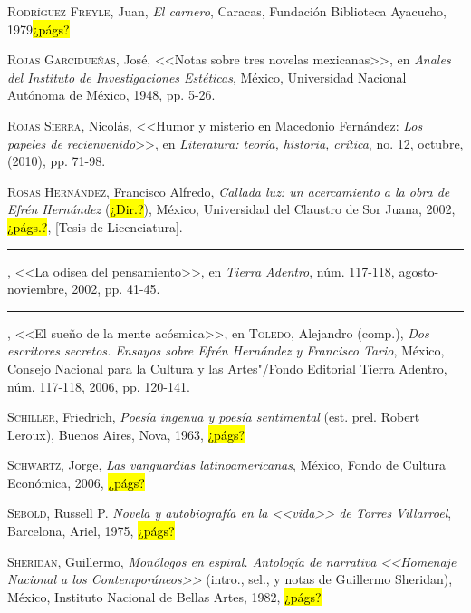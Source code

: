 \documentclass[14pt,twoside,final]{extbook} %
\begin{document}
\textsc{Rodríguez Freyle}, Juan, \emph{El carnero}, Caracas, Fundación Biblioteca Ayacucho, 1979\hl{¿págs?}\label{bib:rodriguez1979}

\textsc{Rojas Garcidueñas}, José, <<Notas sobre tres novelas mexicanas>>, en \emph{Ana\-les del Instituto de Investigaciones Estéticas}, México, Universidad Nacional Autónoma de México, 1948, pp. 5-26.\label{bib:rojas1948}

\textsc{Rojas Sierra}, Nicolás, <<Humor y misterio en Macedonio Fernández: \emph{Los papeles de recienvenido}>>, en \emph{Literatura: teoría, historia, crítica}, no. 12, octubre, (2010), pp. 71-98.\label{bib:rojas2010}

\textsc{Rosas Hernández}, Francisco Alfredo, \emph{Callada luz: un acercamiento a la obra de Efrén Hernández} (\hl{¿Dir.?}), México, Universidad del Claustro de Sor Juana, 2002, \hl{¿págs.?}, [Tesis de Licenciatura].\label{bib:rosas2002a}

\rule{1cm}{0.4pt}, <<La odisea del pensamiento>>, en \emph{Tierra Adentro}, núm. 117-118, agosto-noviembre, 2002, pp. 41-45.\label{bib:rosas2002b}

\rule{1cm}{0.4pt}, <<El sueño de la mente acósmica>>, en \textsc{Toledo}, Alejandro (comp.), \emph{Dos escritores secretos. Ensayos sobre Efrén Hernández y Francisco Tario}, México, Consejo Nacional para la Cultura y las Artes"/Fondo Editorial Tierra Adentro, núm. 117-118, 2006, pp. 120-141.\label{bib:rosas2006}

\textsc{Schiller}, Friedrich, \emph{Poesía ingenua y poesía sentimental} (est. prel. Robert Leroux), Buenos Aires, Nova, 1963, \hl{¿págs?}\label{bib:schiller1963}

\textsc{Schwartz}, Jorge, \emph{Las vanguardias latinoamericanas}, México, Fondo de Cultura Económica, 2006, \hl{¿págs?}\label{bib:schwartz2006}

\textsc{Sebold}, Russell P. \emph{Novela y autobiografía en la <<vida>> de Torres Villarroel}, Barcelona, Ariel, 1975, \hl{¿págs?}\label{bib:sebold1975}

\textsc{Sheridan}, Guillermo, \emph{Monólogos en espiral. Antología de narrativa <<Homenaje Nacional a los \emph{Contemporáneos}>>} (intro., sel., y notas de Guillermo Sheridan), México, Instituto Nacional de Bellas Artes, 1982, \hl{¿págs?}\label{bib:sheridan1982}
\end{document}

